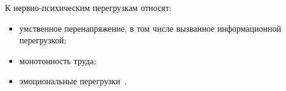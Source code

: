 % 
% 
% 
%  
% 
% 
% 
% 
% 
% 
% 

\setcounter{section}{12}

К нервно-психическим перегрузкам относят:
\begin{itemize}
 \item умственное перенапряжение, в том числе вызванное информационной перегрузкой;
 \item монотонность труда;
 \item эмоциональные перегрузки~\cite{gost_12.0.003-2015}.
\end{itemize}

